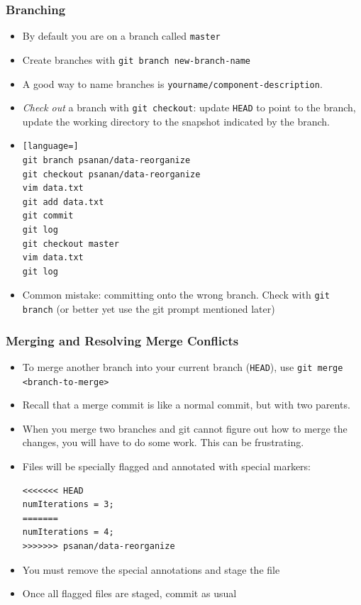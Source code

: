 \documentclass{beamer}
\begin{document}
\begin{frame}[fragile]
\frametitle{Branching}
\begin{itemize}
\item By default you are on a branch called \texttt{master}
\item Create branches with \lstinline{git branch new-branch-name}
\item A good way to name branches is \lstinline{yourname/component-description}.
\item \emph{Check out} a branch with \lstinline{git checkout}: update \texttt{HEAD} to point to the branch, update the working directory to the snapshot indicated by the branch.
\item
\begin{lstlisting}[language=]
git branch psanan/data-reorganize
git checkout psanan/data-reorganize
vim data.txt
git add data.txt
git commit
git log
git checkout master
vim data.txt
git log
\end{lstlisting}
\item Common mistake: committing onto the wrong branch. Check with \lstinline{git branch} (or better yet use the git prompt mentioned later)
\end{itemize}
\end{frame}

\begin{frame}[fragile]
\frametitle{Merging and Resolving Merge Conflicts}
\begin{itemize}
\item To merge another branch into your current branch (\texttt{HEAD}), use \lstinline{git merge <branch-to-merge>}
\item Recall that a merge commit is like a normal commit, but with two parents.
\item When you merge two branches and git cannot figure out how to merge the changes, you will have to do some work. This can be frustrating.
\item Files will be specially flagged and annotated with special markers:
\begin{verbatim}
<<<<<<< HEAD
numIterations = 3;
=======
numIterations = 4;
>>>>>>> psanan/data-reorganize
\end{verbatim}
\item You must remove the special annotations and stage the file
\item Once all flagged files are staged, commit as usual
\end{itemize}
\end{frame}
\end{document}
